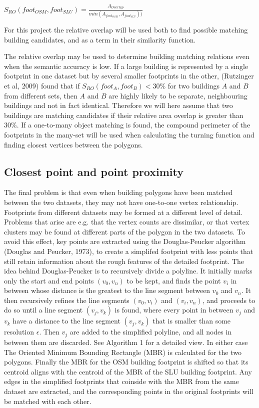 \documentclass[a4paper]{article}
\begin{document}
\begin{center}
    $S_{RO}(foot_{OSM}, foot_{SLU}) = \frac{A_{Overlap}}{min(A_{foot_{OSM}}, A_{foot_{SLU}}))}$
\end{center}

For this project the relative overlap will be used both to find possible matching building candidates, and as a term in their similarity function.

The relative overlap may be used to determine building matching relations even when the semantic accuracy is low. If a large building is represented by a single footprint in one dataset but by several smaller footprints in the other, (Rutzinger et al, 2009) found that if $S_{RO}(foot_{A}, foot_{B}) < 30\%$ for two buildings $A$ and $B$ from different sets, then $A$ and $B$ are highly likely to be separate, neighbouring buildings and not in fact identical. Therefore we will here assume that two buildings are matching candidates if their relative area overlap is greater than 30\%. If a one-to-many object matching is found, the compound perimeter of the footprints in the many-set will be used when calculating the turning function and finding closest vertices between the polygons.

\subsection{Closest point and point proximity}

The final problem is that even when building polygons have been matched between the two datasets, they may not have one-to-one vertex relationship. Footprints from different datasets may be formed at a different level of detail. Problems that arise are e.g. that the vertex counts are dissimilar, or that vertex clusters may be found at different parts of the polygon in the two datasets. To avoid this effect, key points are extracted using the Douglas-Peucker algorithm (Douglas and Peucker, 1973), to create a simplifed footprint with less points that still retain information about the rough features of the detailed footprint. The idea behind Douglas-Peucker is to recursively divide a polyline. It initially marks only the start and end points $(v_0, v_n)$ to be kept, and finds the point $v_i$ in between whose distance is the greatest to the line segment between $v_0$ and $v_n$. It then recursively refines the line segments $(v_0, v_i)$ and $(v_i, v_n)$, and proceeds to do so until a line segment $(v_j, v_k)$ is found, where every point in between $v_j$ and $v_k$ have a distance to the line segment $(v_j, v_k)$ that is smaller than some resolution $\epsilon$. Then $v_j$ are added to the simplified polyline, and all nodes in between them are discarded. See Algorithm 1 for a detailed view. In either case The Oriented Minimum Bounding Rectangle (MBR) is calculated for the two polygons. Finally the MBR for the OSM building footprint is shifted so that its centroid aligns with the centroid of the MBR of the SLU building footprint. Any edges in the simplified footprints that coinside with the MBR from the same dataset are extracted, and the corresponding points in the original footprints will be matched with each other.
\end{document}
